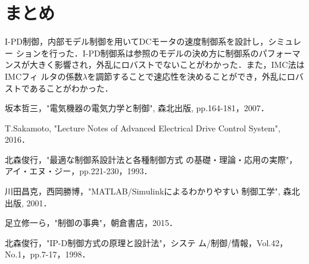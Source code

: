 \documentclass[a4paper,12pt]{jarticle}
\begin{document}
\section{まとめ}
I-PD制御，内部モデル制御を用いてDCモータの速度制御系を設計し，シミュレー
ションを行った．I-PD制御系は参照のモデルの決め方に制御系のパフォーマ
ンスが大きく影響され，外乱にロバストでないことがわかった．また，IMC法はIMCフィ
ルタの係数$\lambda$を調節することで速応性を決めることができ，外乱にロバ
ストであることがわかった．
%
\begin{thebibliography}{99}

  坂本哲三，"電気機器の電気力学と制御", 森北出版, pp.164-181，2007．

  T.Sakamoto,
		 "Lecture Notes of Advanced Electrical Drive Control System",
		 2016．

 北森俊行，"最適な制御系設計法と各種制御方式
		 の基礎・理論・応用の実際"，アイ・エヌ・ジー，pp.221-230，1993．

  川田昌克，西岡勝博，"MATLAB/Simulinkによるわかりやすい
		 制御工学", 森北出版, 2001．

 足立修一ら，"制御の事典"，朝倉書店，2015．

  北森俊行，"IP-D制御方式の原理と設計法"，システ
		 ム/制御/情報，Vol.42，No.1，pp.7-17，1998．
		 
\end{thebibliography}
\end{document}
